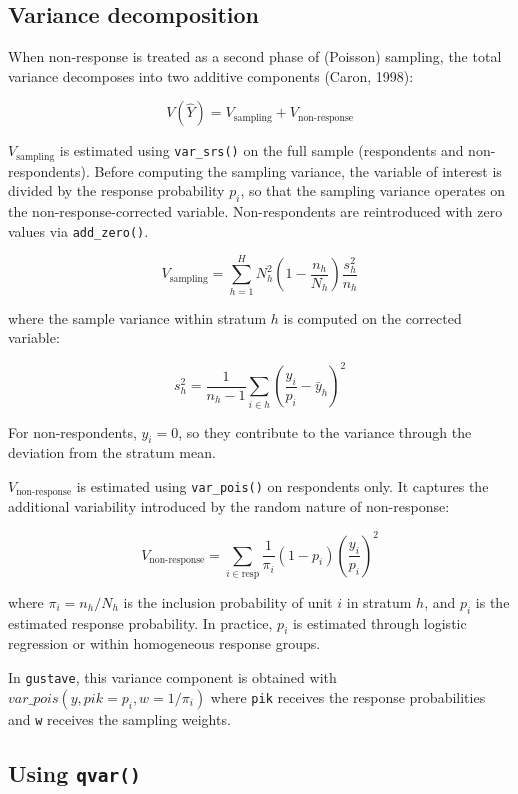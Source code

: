 \documentclass[
]{article}
\begin{document}
\subsection{Variance decomposition}\label{variance-decomposition-1}

When non-response is treated as a second phase of (Poisson) sampling,
the total variance decomposes into two additive components (Caron,
1998):

\[V(\hat{Y}) = V_{\text{sampling}} + V_{\text{non-response}}\]

\(V_{\text{sampling}}\) is estimated using \texttt{var\_srs()} on the
full sample (respondents and non-respondents). Before computing the
sampling variance, the variable of interest is divided by the response
probability \(p_i\), so that the sampling variance operates on the
non-response-corrected variable. Non-respondents are reintroduced with
zero values via \texttt{add\_zero()}.

\[V_{\text{sampling}} = \sum_{h=1}^{H} N_h^2 \left(1 - \frac{n_h}{N_h}\right) \frac{s_h^2}{n_h}\]

where the sample variance within stratum \(h\) is computed on the
corrected variable:

\[s_h^2 = \frac{1}{n_h - 1} \sum_{i \in h} \left(\frac{y_i}{p_i} - \bar y_h \right)^2\]

For non-respondents, \(y_i = 0\), so they contribute to the variance
through the deviation from the stratum mean.

\(V_{\text{non-response}}\) is estimated using \texttt{var\_pois()} on
respondents only. It captures the additional variability introduced by
the random nature of non-response:

\[V_{\text{non-response}} = \sum_{i \in \text{resp}}{ \frac{1}{\pi_i} (1-p_i) \left(\frac{y_i}{p_i}\right)^2}\]

where \(\pi_i = n_h / N_h\) is the inclusion probability of unit \(i\)
in stratum \(h\), and \(p_i\) is the estimated response probability. In
practice, \(p_i\) is estimated through logistic regression or within
homogeneous response groups.

In \texttt{gustave}, this variance component is obtained with
\(var\_pois(y, pik = p_i, w = 1/\pi_i)\) where \texttt{pik} receives the
response probabilities and \texttt{w} receives the sampling weights.

\subsection{\texorpdfstring{Using
\texttt{qvar()}}{Using qvar()}}\label{using-qvar-1}
\end{document}
